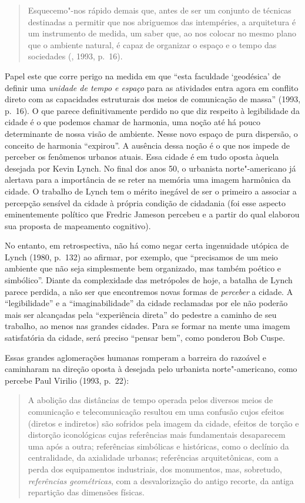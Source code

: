 \begin{quote}
Esquecemo"-nos rápido demais que, antes de ser um conjunto de técnicas
destinadas a permitir que nos abriguemos das intempéries, a arquitetura
é um instrumento de medida, um saber que, ao nos colocar no mesmo plano
que o ambiente natural, é capaz de organizar o espaço e o tempo das
sociedades (, 1993, p.~16).
\end{quote}

Papel este que corre perigo na medida em que ``esta faculdade
`geodésica' de definir uma \emph{unidade de tempo e espaço} para as
atividades entra agora em conflito direto com as capacidades estruturais
dos meios de comunicação de massa'' (1993, p.~16). O que parece
definitivamente perdido no que diz respeito à legibilidade da cidade é o
que podemos chamar de harmonia, uma noção até há pouco determinante de
nossa visão de ambiente. Nesse novo espaço de pura dispersão, o conceito
de harmonia ``expirou''. A ausência dessa noção é o que nos impede de
perceber os fenômenos urbanos atuais. Essa cidade é em tudo oposta
àquela desejada por Kevin Lynch. No final dos anos 50, o urbanista
norte"-americano já alertava para a importância de se reter na memória
uma imagem harmônica da cidade. O trabalho de Lynch tem o mérito
inegável de ser o primeiro a associar a percepção sensível da cidade à
própria condição de cidadania (foi esse aspecto eminentemente político
que Fredric Jameson percebeu e a partir do qual elaborou sua proposta de
mapeamento cognitivo).

No entanto, em retrospectiva, não há como negar certa ingenuidade
utópica de Lynch (1980, p.~132) ao afirmar, por exemplo, que ``precisamos de um meio
ambiente que não seja simplesmente bem organizado, mas também poético e
simbólico''. Diante da complexidade das metrópoles de
hoje, a batalha de Lynch parece perdida, a não ser que encontremos novas
formas de \emph{perceber} a cidade. A ``legibilidade'' e a
``imaginabilidade'' da cidade reclamadas por ele não poderão mais ser
alcançadas pela ``experiência direta'' do pedestre a caminho de seu
trabalho, ao menos nas grandes cidades. Para se formar na mente uma
imagem satisfatória da cidade, será preciso ``pensar bem'', como
ponderou Bob Cuspe.

Essas grandes aglomerações humanas romperam a barreira do razoável e
caminharam na direção oposta à desejada pelo urbanista norte"-americano,
como percebe Paul Virilio (1993, p.~22):

\begin{quote}
A abolição das distâncias de tempo operada pelos diversos meios de
comunicação e telecomunicação resultou em uma confusão cujos efeitos
(diretos e indiretos) são sofridos pela imagem da cidade, efeitos de
torção e distorção iconológicas cujas referências mais fundamentais
desaparecem uma após a outra; referências simbólicas e históricas, como
o declínio da centralidade, da axialidade urbanas; referências
arquitetônicas, com a perda dos equipamentos industriais, dos
monumentos, mas, sobretudo, \emph{referências geométricas}, com a
desvalorização do antigo recorte, da antiga repartição das dimensões
físicas.
\end{quote}

